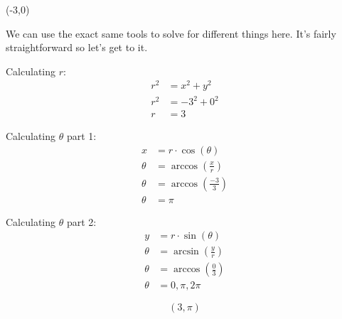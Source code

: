 \begin{problem}[41]
    (-3,0)
\end{problem}

\begin{solution}
    We can use the exact same tools to solve for different things here. It's fairly straightforward so let's get to it. \medskip
    
    Calculating $r$: 
    \begin{align}
        r^2 &= x^2 + y^2 \\
        r^2 &= -3^2 + 0^2 \\
        r &= 3
    \end{align}
    
    Calculating $\theta$ part 1:
    \begin{align}
        x &= r \cdot \cos(\theta) \\
        \theta &= \arccos \left( \frac{x}{r} \right) \\
        \theta &= \arccos \left( \frac{-3}{3} \right) \\
        \theta &= \pi 
        \end{align}
    
    Calculating $\theta$ part 2:
    \begin{align}
        y &= r \cdot \sin(\theta) \\
        \theta &= \arcsin \left( \frac{y}{r} \right) \\
        \theta &= \arccos \left( \frac{0}{3} \right) \\
        \theta &= 0, \pi, 2\pi
    \end{align}
    
    \[\boxed{ \left( 3, \pi \right)}\]
\end{solution}